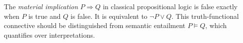
The \emph{material implication} $P\Rightarrow Q$ in classical propositional logic is false exactly when $P$ is true and $Q$ is false. It is equivalent to $\neg P\lor Q$. This truth-functional connective should be distinguished from semantic entailment $P\models Q$, which quantifies over interpretations.
